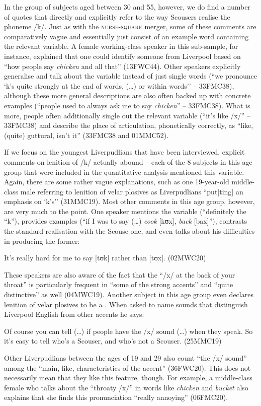 In the group of subjects aged between 30 and 55, however, we do find a number of quotes that directly and explicitly refer to the way Scousers realise the phoneme /k/.
Just as with the \textsc{nurse}-\textsc{square} merger, some of these comments are comparatively vague and essentially just consist of an example word containing the relevant variable.
A female working-class speaker in this sub-sample, for instance, explained that one could identify someone from Liverpool based on ``how people say \emph{chicken} and all that'' (13FWC44).
Other speakers explicitly generalise and talk about the variable instead of just single words (``we pronounce `k's quite strongly at the end of words, (\ldots) or within words'' -- 33FMC38), although these more general descriptions are also often backed up with concrete examples (``people used to always ask me to say \emph{chicken}'' -- 33FMC38).
What is more, people often additionally single out the relevant variable (``it's like /x/'' -- 33FMC38) and describe the place of articulation, phonetically correctly, as ``like, (quite) guttural, isn't it'' (33FMC38 and 01MMC52).

If we focus on the youngest Liverpudlians that have been interviewed, explicit comments on lenition of /k/ actually abound -- each of the 8 subjects in this age group that were included in the quantitative analysis mentioned this variable.
Again, there are some rather vague explanations, such as one 19-year-old middle-class male referring to lenition of velar plosives as Liverpudlians ``put[ting] an emphasis on `k's'' (31MMC19).
Most other comments in this age group, however, are very much to the point.
One speaker mentions the variable (``definitely the ``k''), provides examples (``if I was to say (\ldots) \emph{cook} [kʊx], \emph{back} [bax]''), contrasts the standard realisation with the Scouse one, and even talks about his difficulties in producing the former: 
\begin{example}
	It's really hard for me to say [tʊk] rather than [tʊx]. (02MWC20)
\end{example}

These speakers are also aware of the fact that the ``/x/ at the back of your throat'' is particularly frequent in ``some of the strong accents'' and ``quite distinctive'' as well (04MWC19).
Another subject in this age group even declares lenition of velar plosives to be a .
When asked to name sounds that distinguish Liverpool English from other accents he says:
\begin{example}
	Of course you can tell (\ldots) if people have the /x/ sound (\ldots) when they speak.
	So it's easy to tell who's a Scouser, and who's not a Scouser. (25MMC19)
\end{example}
Other Liverpudlians between the ages of 19 and 29 also count ``the /x/ sound'' among the ``main, like, characteristics of the accent'' (36FWC20).
This does not necessarily mean that they like this feature, though.
For example, a middle-class female who talks about the ``throaty /x/'' in words like \emph{chicken} and \emph{bucket} also explains that she finds this pronunciation ``really annoying'' (06FMC20).

